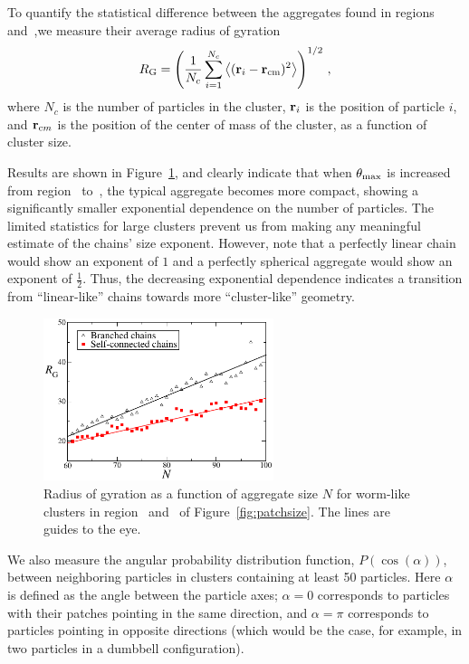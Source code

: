 To quantify the statistical difference between the aggregates found in regions~ and~,we measure their average radius of gyration 
\begin{equation}R_{\rm G}=\left ( \frac{1}{N_c}\sum_{i=1}^{N_c} \left<({\bf{r}}_i-{\bf{r}}_{\rm cm})^2\right> \right )^{1/2} \,,\end{equation}
where $N_c$ is the number of particles in the cluster, ${\bf{r}}_i$ is the position of particle $i$, and ${\bf{r}}_{\textrm cm}$ is the position of the center of mass of the cluster,
as a function of cluster size. 

Results are shown in Figure~\ref{gyration}, and clearly indicate that when $\theta_{\rm max}$ is increased from region~ to~, the typical aggregate becomes more compact, showing a significantly smaller exponential dependence on the number of particles.
The limited statistics for large clusters prevent us from making any meaningful estimate of the chains' size exponent.
However, note that a perfectly linear chain would show an exponent of $1$ and a perfectly spherical aggregate would show an exponent of $\frac{1}{2}$.
Thus, the decreasing exponential dependence indicates a transition from ``linear-like'' chains towards more ``cluster-like'' geometry.
\begin{figure}
	\begin{center}\includegraphics[width=0.6\textwidth]{janus/rg}\end{center}
		\caption[Radius of gyration vs. aggregate size]{Radius of gyration as a function of aggregate size $N$ for worm-like clusters in region~ and~ of Figure~\ref{fig:patchsize}. The lines are guides to the eye.}
		\label{gyration}

\end{figure}

We also measure the angular probability distribution function, $P(\cos(\alpha))$, between neighboring particles in  clusters containing at least 50 particles. 
Here $\alpha$ is defined as the angle between the particle axes; $\alpha = 0$ corresponds to particles with their patches pointing in the same direction, and $\alpha = \pi$ corresponds to particles pointing in opposite directions (which would be the case, for example, in two particles in a dumbbell configuration).

